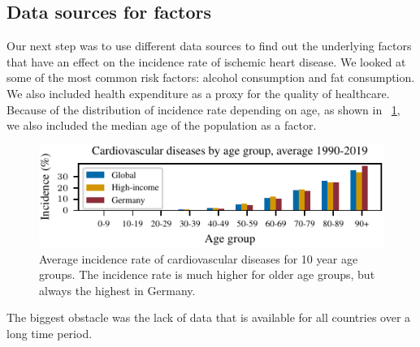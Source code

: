 \subsection{Data sources for factors}\label{sec:data_sources}

Our next step was to use different data sources to find out the underlying factors that have an effect on the incidence rate of ischemic heart disease. We looked at some of the most common risk factors: alcohol consumption and fat consumption. We also included health expenditure as a proxy for the quality of healthcare. Because of the 
distribution of incidence rate depending on age, as shown in \figurename~\ref{Cardiovascular diseases for age groups}, we also included the median age of the population as a factor.

\begin{figure}[ht]
    \vskip 0.2in
    \begin{center}
    \centerline{\includegraphics[width=\columnwidth]{fig/fig_cardiovascular_disease_agerange.pdf}}
    \caption{Average incidence rate of cardiovascular diseases for 10 year age groups. The incidence rate is much higher for older age groups, but 
    always the highest in Germany.}
    \label{Cardiovascular diseases for age groups}
    \end{center}
    \vskip -0.2in
\end{figure}

The biggest obstacle was the lack of data that is available for all countries over a long time period. 


